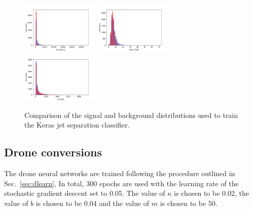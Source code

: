 \documentclass[final,5p,times,twocolumn]{elsarticle}
\begin{document}
\begin{figure}[t]
\includegraphics[width=0.33\textwidth]{input_gpd_kt2.png}
\includegraphics[width=0.33\textwidth]{input_gpd_mass.png}
\includegraphics[width=0.33\textwidth]{input_gpd_mom.png}
\caption{\small Comparison of the signal and background distributions
used to train the Keras jet separation classifier.}
\label{fig:inputsGPD}
\end{figure}

\subsection{Drone conversions}

The drone neural networks are trained following the procedure outlined in Sec.~\ref{sec:dlearn},
In total, 300 epochs are used with
the learning rate of the stochastic gradient descent set to 0.05.
The value of $\kappa$ is chosen to be 0.02, the value of $b$ is chosen to
be 0.04 and the value of $m$ is chosen to be 50.
\end{document}
